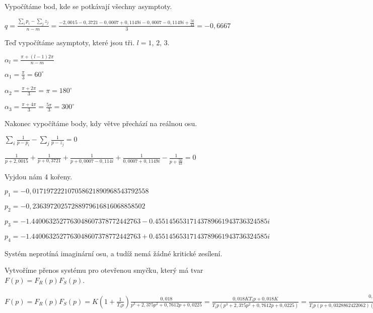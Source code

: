 \documentclass{article}
\begin{document}
			\begin{center}
			Vypočítáme bod, kde se potkávají všechny asymptoty.
			
			\bigskip
			
			$q=\frac{\sum_i p_i - \sum_j z_j}{n-m}=\frac{-2,0015-0,3721-0,0007+0,1149i-0,0007-0,1149i+\frac{50}{43}}{3}=- 0,6667$
			
			\bigskip
			
			Teď vypočítáme asymptoty, které jsou tři. $l=1$, $2$, $3$.
			
			\bigskip
			
			$\alpha_l=\frac{\pi+(l-1)2\pi}{n-m}$
			
			$\alpha_1=\frac{\pi}{3}=60^{\circ}$
			
			$\alpha_2=\frac{\pi+2\pi}{3}=\pi=180^{\circ}$
			
			$\alpha_3=\frac{\pi+4\pi}{3}=\frac{5\pi}{3}=300^{\circ}$
			
			\bigskip
			
			Nakonec vypočítáme body, kdy větve přechází na reálnou osu.
			
			\bigskip
			
			$\sum_i \frac{1}{p-p_i}-\sum_j \frac{1}{p-z_j}=0$
			
			$\frac{1}{p+2,0015}+\frac{1}{p+0,3721}+\frac{1}{p+0,0007-0,114i}+\frac{1}{0,0007+0,1149i}-\frac{1}{p+\frac{50}{43}}=0$
			
			\bigskip
			
			Vyjdou nám 4 kořeny. 
			
			\bigskip
			
			$p_1=-0,017197222107058621890968543792558$
			
			$p_2=-0,23639720257288979616816068858502$
			
			$p_3=- 1.4400632527763048607378772442763 - 0.45514565317143789661943736324585i$
			
			$p_4=- 1.4400632527763048607378772442763 + 0.45514565317143789661943736324585i$
			
			\bigskip
			
			
			\end{center}
			
			\bigskip
			
Systém neprotíná imaginární osu, a tudíž nemá žádné kritické zesílení.
			
			Vytvoříme přenos systému pro otevřenou smyčku, který má tvar $F(p)=F_R(p)F_S(p)$.
			\begin{center}
			$F(p)=F_R(p)F_S(p)=K(1+\frac{1}{T_ip})\frac{0,018}{p^3 + 2,375 p^2 + 0,7612 p + 0,0225}=\frac{0,018KT_ip+0,018K}{T_ip(p^3 + 2,375 p^2 + 0,7612 p + 0,0225)}=\frac{0,018KT_i(p+\frac{1}{T_i})}{T_ip(p+0,0328862422062)(p+2,00003066251)(p+0,342083095279)}$
			\end{center}
			
\end{document}
